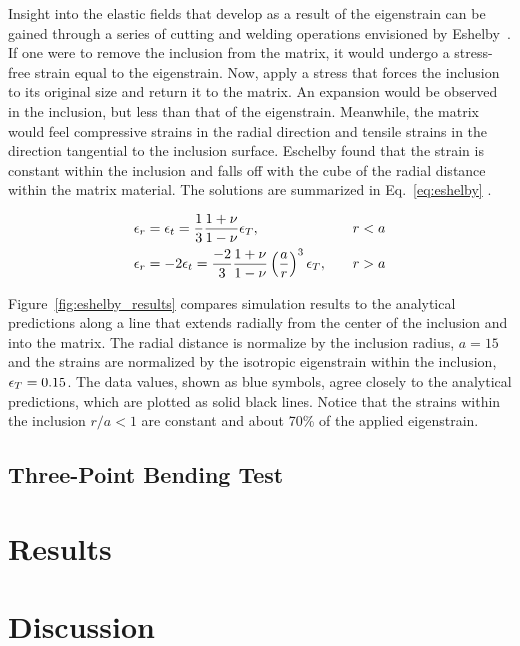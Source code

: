 Insight into the elastic fields that develop as a result of the eigenstrain can be gained through a series of cutting and welding operations envisioned by Eshelby~\cite{Eshelby1957}. If one were to remove the inclusion from the matrix, it would undergo a stress-free strain equal to the eigenstrain. Now, apply a stress that forces the inclusion to its original size and return it to the matrix. An expansion would be observed in the inclusion, but less than that of the eigenstrain. Meanwhile, the matrix would feel compressive strains in the radial direction and tensile strains in the direction tangential to the inclusion surface. Eschelby found that the strain is constant within the inclusion and falls off with the cube of the radial distance within the matrix material. The solutions are summarized in Eq.~\ref{eq:eshelby} \cite{Mura1982}.

\begin{equation}
\begin{alignedat}{2}
	\label{eq:eshelby}
		\epsilon_r &= \epsilon_t = \frac{1}{3}\frac{1+\nu}{1-\nu} \epsilon_T, &&\qquad r<a \\
		\epsilon_r &= -2\epsilon_t= \frac{-2}{3} \frac{1+\nu}{1-\nu} \left(\frac{a}{r}\right)^3 \epsilon_T, &&\qquad r>a
\end{alignedat}
\end{equation}


Figure~\ref{fig:eshelby_results} compares simulation results to the analytical predictions along a line that extends radially from the center of the inclusion and into the matrix. The radial distance is normalize by the inclusion radius, $a=15$ and the strains are normalized by the isotropic eigenstrain within the inclusion, $\epsilon_T = 0.15$. The data values, shown as blue symbols, agree closely to the analytical predictions, which are plotted as solid black lines. Notice that the strains within the inclusion $r/a<1$ are constant and about 70\% of the applied eigenstrain.

\subsection{Three-Point Bending Test}
 
\section{Results}
\section{Discussion}